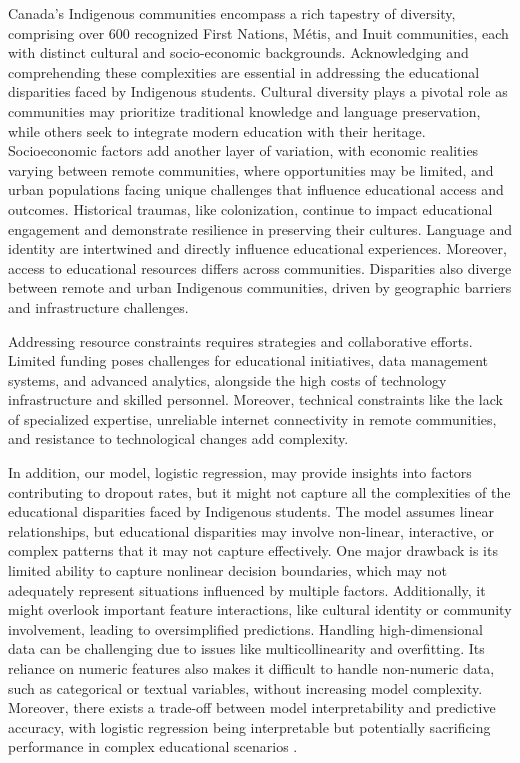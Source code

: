 \documentclass[conference]{IEEEtran}
\begin{document}
Canada's Indigenous communities encompass a rich tapestry of diversity, comprising over 600 recognized First Nations, Métis, and Inuit communities, each with distinct cultural and socio-economic backgrounds. Acknowledging and comprehending these complexities are essential in addressing the educational disparities faced by Indigenous students. Cultural diversity plays a pivotal role as communities may prioritize traditional knowledge and language preservation, while others seek to integrate modern education with their heritage. Socioeconomic factors add another layer of variation, with economic realities varying between remote communities, where opportunities may be limited, and urban populations facing unique challenges that influence educational access and outcomes. Historical traumas, like colonization, continue to impact educational engagement and demonstrate resilience in preserving their cultures. Language and identity are intertwined and directly influence educational experiences. Moreover, access to educational resources differs across communities. Disparities also diverge between remote and urban Indigenous communities, driven by geographic barriers and infrastructure challenges.

Addressing resource constraints requires strategies and collaborative efforts. Limited funding poses challenges for educational initiatives, data management systems, and advanced analytics, alongside the high costs of technology infrastructure and skilled personnel. Moreover, technical constraints like the lack of specialized expertise, unreliable internet connectivity in remote communities, and resistance to technological changes add complexity.

In addition, our model, logistic regression, may provide insights into factors contributing to dropout rates, but it might not capture all the complexities of the educational disparities faced by Indigenous students. The model assumes linear relationships, but educational disparities may involve non-linear, interactive, or complex patterns that it may not capture effectively. One major drawback is its limited ability to capture nonlinear decision boundaries, which may not adequately represent situations influenced by multiple factors. Additionally, it might overlook important feature interactions, like cultural identity or community involvement, leading to oversimplified predictions. Handling high-dimensional data can be challenging due to issues like multicollinearity and overfitting. Its reliance on numeric features also makes it difficult to handle non-numeric data, such as categorical or textual variables, without increasing model complexity. Moreover, there exists a trade-off between model interpretability and predictive accuracy, with logistic regression being interpretable but potentially sacrificing performance in complex educational scenarios \cite{r20}.
\end{document}
